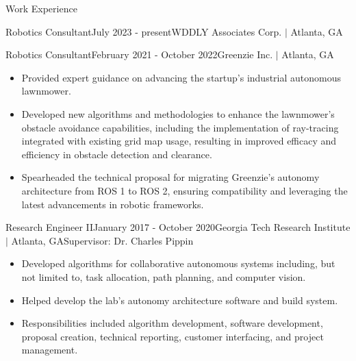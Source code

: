 \documentclass{resume} %
\begin{document}
\begin{rSection}{Work Experience}
\begin{rSubsection}{Robotics Consultant}{July 2023 - present}{WDDLY Associates Corp. $\vert$ Atlanta, GA}{}
\end{rSubsection}


\begin{rSubsection}{Robotics Consultant}{February 2021 - October 2022}{Greenzie Inc. $\vert$ Atlanta, GA}{}

\item
\begin{itemize}
\item Provided expert guidance on advancing the startup's industrial autonomous
  lawnmower.

\item Developed new algorithms and methodologies to enhance the lawnmower's
  obstacle avoidance capabilities, including the implementation of ray-tracing
  integrated with existing grid map usage, resulting in improved efficacy and
  efficiency in obstacle detection and clearance.

\item Spearheaded the technical proposal for migrating Greenzie's autonomy
  architecture from ROS 1 to ROS 2, ensuring compatibility and leveraging the
  latest advancements in robotic frameworks.

\end{itemize}

\end{rSubsection}


\begin{rSubsection}{Research Engineer II}{January 2017 - October 2020}{Georgia Tech Research Institute $\vert$ Atlanta, GA}{Supervisor: Dr. Charles Pippin}

\item
\begin{itemize}
\item Developed algorithms for collaborative autonomous systems including, but
  not limited to, task allocation, path planning, and computer vision.

\item Helped develop the lab’s autonomy architecture software and build system.

\item Responsibilities included algorithm development, software development,
  proposal creation, technical reporting, customer interfacing, and project
  management.

\end{itemize}


\end{rSubsection}
\end{rSection}
\end{document}
